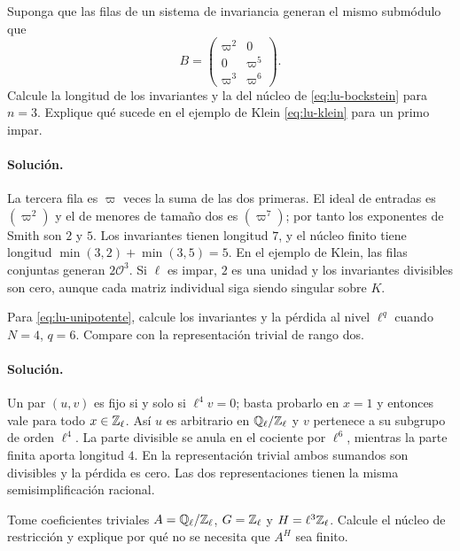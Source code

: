 \begin{ejercicio}
\label{ex:lu-3}
Suponga que las filas de un sistema de invariancia generan el
mismo submódulo que
\[
 B=\begin{pmatrix}\varpi^2&0\\0&\varpi^5\\
                       \varpi^3&\varpi^6\end{pmatrix}.
\]
Calcule la longitud de los invariantes y la del núcleo de
\eqref{eq:lu-bockstein} para $n=3$. Explique qué sucede en el
ejemplo de Klein \eqref{eq:lu-klein} para un primo impar.
\end{ejercicio}
\paragraph{Solución.}
La tercera fila es $\varpi$ veces la suma de las dos primeras.
El ideal de entradas es $(\varpi^2)$ y el de menores de tamaño
dos es $(\varpi^7)$; por tanto los exponentes de Smith son
$2$ y $5$. Los invariantes tienen longitud $7$, y el núcleo
finito tiene longitud $\min(3,2)+\min(3,5)=5$.
En el ejemplo de Klein, las filas conjuntas generan
$2\mathcal O^3$. Si $\ell$ es impar, $2$ es una unidad y los
invariantes divisibles son cero, aunque cada matriz individual
siga siendo singular sobre $K$.

\begin{ejercicio}
\label{ex:lu-4}
Para \eqref{eq:lu-unipotente}, calcule los invariantes y la
pérdida al nivel $\ell^q$ cuando $N=4$, $q=6$. Compare con la
representación trivial de rango dos.
\end{ejercicio}
\paragraph{Solución.}
Un par $(u,v)$ es fijo si y solo si $\ell^4v=0$; basta probarlo
en $x=1$ y entonces vale para todo $x\in\mathbb{Z}_\ell$.
Así $u$ es arbitrario en $\mathbb{Q}_\ell/\mathbb{Z}_\ell$ y $v$ pertenece
a su subgrupo de orden $\ell^4$. La parte divisible se anula
en el cociente por $\ell^6$, mientras la parte finita aporta
longitud $4$. En la representación trivial ambos sumandos son
divisibles y la pérdida es cero. Las dos representaciones tienen
la misma semisimplificación racional.

\begin{ejercicio}
\label{ex:lu-5}
Tome coeficientes triviales $A=\mathbb{Q}_\ell/\mathbb{Z}_\ell$,
$G=\mathbb{Z}_\ell$ y $H=\ell^3\mathbb{Z}_\ell$. Calcule el núcleo de
restricción y explique por qué no se necesita que $A^H$ sea finito.
\end{ejercicio}
